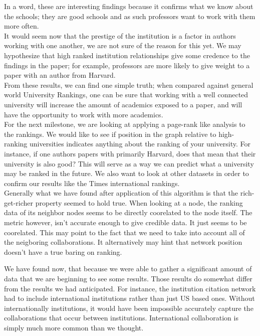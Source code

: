 \documentclass[times, 10pt,twocolumn]{article}
\begin{document}
In a word, these are interesting findings because it confirms what we know about the schools; they are good schools and as such professors want to work with them more often. \\

It would seem now that the prestige of the institution is a factor in authors working with one another, we are not sure of the reason for this yet. We may hypothesize that high ranked institution relationships give some credence to the findings in the paper; for example, professors are more likely to give weight to a paper with an author from Harvard.\\

From these results, we can find one simple truth; when compared against general world University Rankings, one can be sure that working with a well connected university will increase the amount of academics exposed to a paper, and will have the opportunity to work with more academics. \\

For the next milestone, we are looking at applying a page-rank like analysis to the rankings. We would like to see if position in the graph relative to high-ranking universities indicates anything about the ranking of your university. For instance, if one authors papers with primarily Harvard, does that mean that their university is also good? This will serve as a way we can predict what a university may be ranked in the future. We also want to look at other datasets in order to confirm our results like the Times international rankings. \\

Generally what we have found after application of this algorithm is that the rich-get-richer property seemed to hold true. When looking at a node, the ranking data of its neighbor nodes seems to be directly coorelated to the node itself. The metric however, isn't accurate enough to give credible data. It just seems to be coorelated. This may point to the fact that we need to take into account all of the neigboring collaborations. It alternatively may hint that network position doesn't have a true baring on ranking.

We have found now, that because we were able to gather a significant amount of data that we are beginning to see some results. Those results do somewhat differ from the results we had anticipated. For instance, the institution citation network had to include international institutions rather than just US based ones. Without internationally institutions, it would have been impossible accurately capture the collaborations that occur between institutions. International collaboration is simply much more common than we thought. \\
\end{document}
